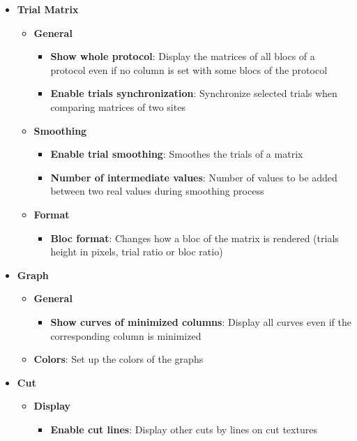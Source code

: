 \documentclass[a4paper]{article}
\begin{document}
\begin{itemize}
\begin{itemize}
\begin{itemize}
\end{itemize}
\item \textbf{Trial Matrix}
\begin{itemize}
\item \textbf{General}
\begin{itemize}
\item \textbf{Show whole protocol}: Display the matrices of all blocs of a protocol even if no column is set with some blocs of the protocol
\item \textbf{Enable trials synchronization}: Synchronize selected trials when comparing matrices of two sites
\end{itemize}
\item \textbf{Smoothing}
\begin{itemize}
\item \textbf{Enable trial smoothing}: Smoothes the trials of a matrix
\item \textbf{Number of intermediate values}: Number of values to be added between two real values during smoothing process
\end{itemize}
\item \textbf{Format}
\begin{itemize}
\item \textbf{Bloc format}: Changes how a bloc of the matrix is rendered (trials height in pixels, trial ratio or bloc ratio)
\end{itemize}
\end{itemize}
\item \textbf{Graph}
\begin{itemize}
\item \textbf{General}
\begin{itemize}
\item \textbf{Show curves of minimized columns}: Display all curves even if the corresponding column is minimized
\end{itemize}
\item \textbf{Colors}: Set up the colors of the graphs
\end{itemize}
\item \textbf{Cut}
\begin{itemize}
\item \textbf{Display}
\begin{itemize}
\item \textbf{Enable cut lines}: Display other cuts by lines on cut textures
\end{itemize}
\end{itemize}
\end{itemize}
\end{itemize}
\end{document}
